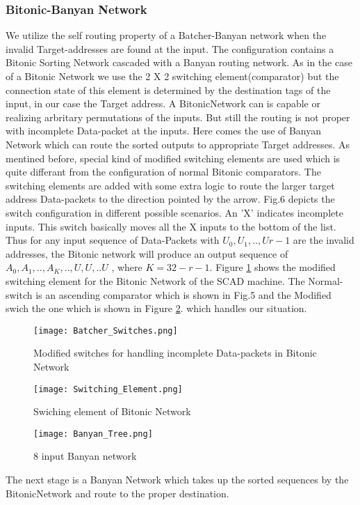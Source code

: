 				  \subsubsection{Bitonic-Banyan Network}
					      We utilize the self routing property of a Batcher-Banyan network \cite{batcher_banyan_ref} when the invalid Target-addresses are found at the input. The configuration contains
					      a Bitonic Sorting Network cascaded with a Banyan routing network. As in the case of a Bitonic Network we use the 2 X 2 switching element(comparator) but the connection state of this
					      element is determined by the destination tags of the input, in our case the Target address. A BitonicNetwork can is capable or realizing arbritary permutations of the inputs. 
					      But still the routing is not proper with incomplete Data-packet at the inputs. Here comes the use of Banyan Network which can route the sorted outputs to appropriate
					      Target addresses. As mentined before, special kind of modified switching elements are used which is quite differant from the configuration of normal Bitonic comparators.
					      The switching elements are added with some extra logic to route the larger target address Data-packets to the direction pointed by the arrow. 
					      Fig.6 depicts the switch configuration in different possible scenarios. An 'X' indicates incomplete inputs. This switch basically moves all the X inputs to the bottom of the list.
					      Thus for any input sequence of Data-Packets with $U_{0},U_{1},..,U{r-1}$  are the invalid addresses, the Bitonic network will produce an output sequence of $A_{0},A_{1},..,A_{K},..,U,U,..U$ , where
					      $ K = 32 - r -1$. Figure \ref{fig:Batcher_Switches} shows the modified switching element for the Bitonic Network of the SCAD machine. The Normal-switch is an ascending comparator which is shown in Fig.5 and
					      the Modified swich the one which is shown in Figure \ref{fig:Switching_Element}.
					      which handles our situation.
					      \begin{figure}[!ht]
						      \texttt{[image: Batcher\_Switches.png]}
						      \caption{Modified switches for handling incomplete Data-packets in Bitonic Network}
					      \label{fig:Batcher_Switches}
					      \end{figure}
					      \begin{figure}[!ht]
						      \texttt{[image: Switching\_Element.png]}
						      \caption{Swiching element of Bitonic Network}
					      \label{fig:Switching_Element}
					      \end{figure}
					      \begin{figure}[!ht]
						      \texttt{[image: Banyan\_Tree.png]}
						      \caption{8 input Banyan network}
					      \label{fig:Banyan_Tree}
					      \end{figure}
					      The next stage is a Banyan Network which takes up the sorted sequences by the BitonicNetwork and route to the proper destination. 
					      
